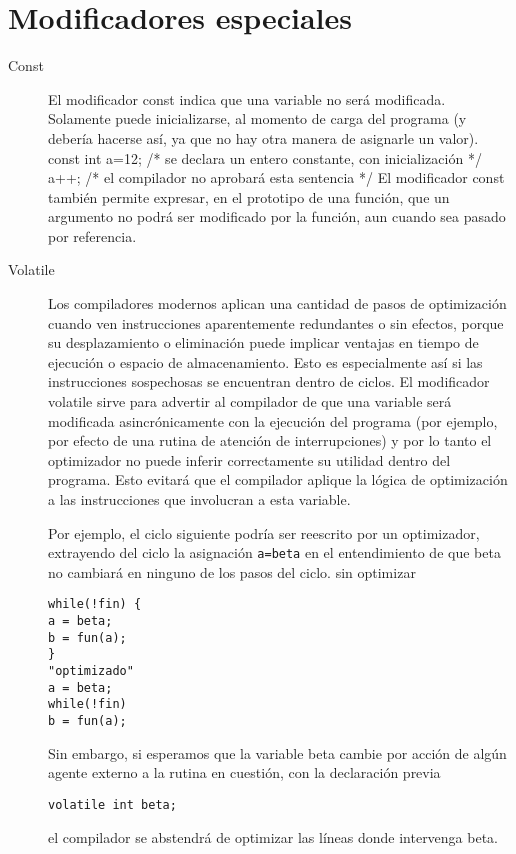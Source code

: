 \section{Modificadores especiales}

\begin{description}
	\item[Const] 
	El modificador const indica que una variable no será modificada. Solamente puede inicializarse, al
momento de carga del programa (y debería hacerse así, ya que no hay otra manera de asignarle un
valor).
const int a=12; /* se declara un entero constante, con inicialización */
a++;
/* el compilador no aprobará esta sentencia */
El modificador const también permite expresar, en el prototipo de una función, que un argumento no
podrá ser modificado por la función, aun cuando sea pasado por referencia.
\item [Volatile]
Los compiladores modernos aplican una cantidad de pasos de optimización cuando ven instrucciones
aparentemente redundantes o sin efectos, porque su desplazamiento o eliminación puede implicar
ventajas en tiempo de ejecución o espacio de almacenamiento. Esto es especialmente así si las
instrucciones sospechosas se encuentran dentro de ciclos. El modificador volatile sirve para advertir al
compilador de que una variable será modificada asincrónicamente con la ejecución del programa (por
ejemplo, por efecto de una rutina de atención de interrupciones) y por lo tanto el optimizador no puede
inferir correctamente su utilidad dentro del programa. Esto evitará que el compilador aplique la lógica
de optimización a las instrucciones que involucran a esta variable.

Por ejemplo, el ciclo siguiente podría ser reescrito por un optimizador, extrayendo del ciclo la
asignación \texttt{a=beta} en el entendimiento de que beta no cambiará en ninguno de los pasos del ciclo.
sin optimizar
\begin{lstlisting}
while(!fin) {
a = beta;
b = fun(a);
}
"optimizado"
a = beta;
while(!fin)
b = fun(a);

\end{lstlisting}
Sin embargo, si esperamos que la variable beta cambie por acción de algún agente externo a la rutina
en cuestión, con la declaración previa
\begin{lstlisting}
volatile int beta;
\end{lstlisting}
el compilador se abstendrá de optimizar las líneas donde intervenga beta.

\end{description}

